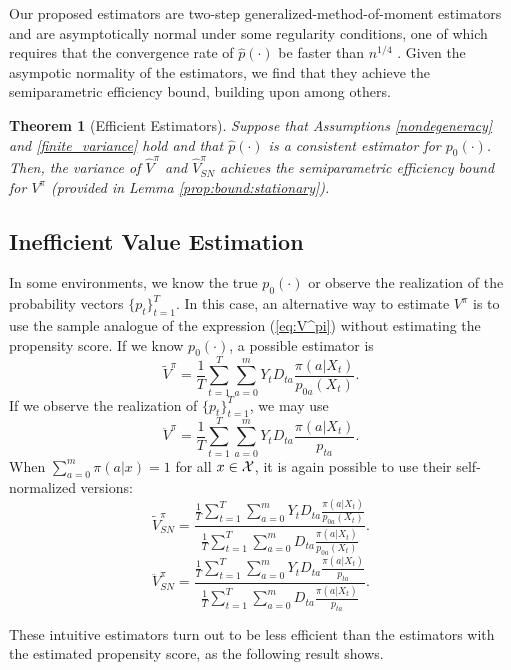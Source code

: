 \documentclass[letterpaper]{article} \usepackage{aaai19}  \usepackage{times}  \usepackage{helvet}  \usepackage{courier}  \usepackage{url}  \usepackage{graphicx}  \frenchspacing  \usepackage{comment}
\newtheorem{theorem}{Theorem}
\newcommand{\citet}[1]
{\citeauthor{#1} \shortcite{#1}}
\begin{document}
Our proposed estimators are two-step generalized-method-of-moment estimators and are asymptotically normal under some regularity conditions, one of which requires that the convergence rate of $\hat p(\cdot)$ be faster than $n^{1/4}$ \cite{Newey1994,chen2007large}.
Given the asympotic normality of the estimators, we find that they achieve the semiparametric efficiency bound, building upon \citet{Ackerberg2014} among others.

\begin{theorem}[Efficient Estimators]\label{prop:estimator:stationary}
	Suppose that Assumptions \ref{nondegeneracy} and \ref{finite_variance} hold and that $\hat p(\cdot)$ is a consistent estimator for $p_0(\cdot)$.
	Then, the variance of $\hat V^{\pi}$ and $\hat V^{\pi}_{SN}$ achieves the semiparametric efficiency bound for $V^{\pi}$ (provided in Lemma \ref{prop:bound:stationary}).
\end{theorem}



\subsection{Inefficient Value Estimation}

In some environments, we know the true $p_0(\cdot)$ or observe the realization of the probability vectors $\{p_t\}_{t=1}^T$.
In this case, an alternative way to estimate $V^\pi$ is to use the sample analogue of the expression (\ref{eq:V^pi}) without estimating the propensity score. 
If we know $p_0(\cdot)$, a possible estimator is
$$
\tilde V^{\pi}=\frac{1}{T}\sum_{t=1}^T\sum_{a=0}^m Y_tD_{ta}\frac{\pi(a|X_t)}{p_{0a}(X_t)}.
$$
If we observe the realization of $\{p_t\}_{t=1}^T$, we may use
$$
\ddot V^{\pi}=\frac{1}{T}\sum_{t=1}^T\sum_{a=0}^m Y_tD_{ta}\frac{\pi(a|X_t)}{p_{ta}}.
$$
When $\sum_{a=0}^m\pi(a|x)=1$ for all $x\in {\cal X}$, it is again possible to use their self-normalized versions: 
$$
\tilde V^{\pi}_{SN}=\dfrac{\frac{1}{T}\sum_{t=1}^T\sum_{a=0}^m Y_tD_{ta}\frac{\pi(a|X_t)}{p_{0a}(X_t)}}{\frac{1}{T}\sum_{t=1}^T\sum_{a=0}^m D_{ta}\frac{\pi(a|X_t)}{p_{0a}(X_t)}}.
$$
$$
\ddot V^{\pi}_{SN}=\dfrac{\frac{1}{T}\sum_{t=1}^T\sum_{a=0}^m Y_tD_{ta}\frac{\pi(a|X_t)}{p_{ta}}}{\frac{1}{T}\sum_{t=1}^T\sum_{a=0}^m D_{ta}\frac{\pi(a|X_t)}{p_{ta}}}.
$$

These intuitive estimators turn out to be less efficient than the estimators with the estimated propensity score, as the following result shows.
\end{document}
